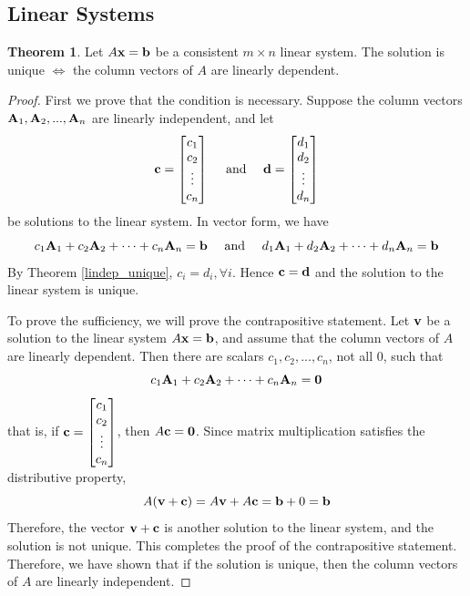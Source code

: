 \documentclass{article}
\theoremstyle{definition}
\newtheorem{theorem}{Theorem}
\newcommand{\bmat}[1]{\begin{bmatrix}#1\end{bmatrix}}
\begin{document}
\subsection{Linear Systems}
\begin{theorem}
	Let $A\vb{x} = \vb{b}$ be a consistent $m \times n$ linear system. The solution is unique $\iff$ the column vectors of $A$ are linearly dependent.
	\begin{proof}
		First we prove that the condition is necessary. Suppose the column vectors $\vb{A}_1, \vb{A}_2, ..., \vb{A}_n$ are linearly independent, and let
		\[ \vb{c} = \bmat{c_1\\c_2\\\vdots\\c_n} \quad \text{ and } \quad \vb{d} = \bmat{d_1\\d_2\\\vdots\\d_n} \]
		be solutions to the linear system. In vector form, we have
		\[ c_1\vb{A}_1 + c_2\vb{A}_2 + \cdots + c_n\vb{A}_n = \vb{b} \quad \text{ and } \quad d_1\vb{A}_1 + d_2\vb{A}_2 + \cdots + d_n\vb{A}_n = \vb{b} \]
		By Theorem \ref{lindep_unique}, $c_i = d_i, \forall i$. Hence $\vb{c} = \vb{d}$ and the solution to the linear system is unique.\par
		To prove the sufficiency, we will prove the contrapositive statement. Let $\vb{v}$ be a solution to the linear system $A\vb{x} = \vb{b}$, and assume that the column vectors of $A$ are linearly dependent. Then there are scalars $c_1, c_2, ..., c_n$, not all 0, such that
		\[ c_1\vb{A}_1 + c_2\vb{A}_2 + \cdots + c_n\vb{A}_n = \vb{0} \]
		that is, if $\vb{c} = \bmat{c_1\\c_2\\\vdots\\c_n}$, then $A\vb{c} = \vb{0}$. Since matrix multiplication satisfies the distributive property,
		\[ A(\vb{v} + \vb{c}) = A\vb{v} + A\vb{c} = \vb{b} + 0 = \vb{b} \]
		Therefore, the vector $\vb{v} + \vb{c}$ is another solution to the linear system, and the solution is not unique. This completes the proof of the contrapositive statement. Therefore, we have shown that if the solution is unique, then the column vectors of $A$ are linearly independent.
	\end{proof}
\end{theorem}
\end{document}
